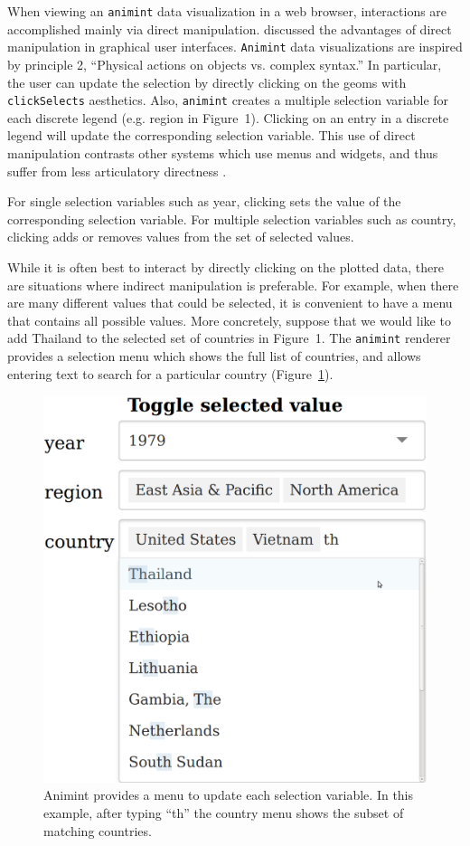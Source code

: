\documentclass[journal]{vgtc}\usepackage[]{graphicx}\usepackage[]{color}
\begin{document}
When viewing an \texttt{animint} data visualization in a web browser,
interactions are accomplished mainly via direct
manipulation. \citet{instrumental-interaction} discussed the
advantages of direct manipulation in graphical user
interfaces. \texttt{Animint} data visualizations are inspired by principle 2,
``Physical actions on objects vs. complex syntax.'' In particular, the
user can update the selection by directly clicking on the geoms with
\texttt{clickSelects} aesthetics. Also, \texttt{animint} creates a multiple
selection variable for each discrete legend (e.g. region in
Figure~1). Clicking on an entry in a discrete legend will update the
corresponding selection variable. This use of direct manipulation
contrasts other systems which use menus and widgets, and thus suffer
from less articulatory directness \citep{Hutchins:1985}.

For single selection variables such as year, clicking sets the value
of the corresponding selection variable. For multiple selection
variables such as country, clicking adds or removes values from the
set of selected values.

While it is often best to interact by directly clicking on the plotted
data, there are situations where indirect manipulation is
preferable. For example, when there are many different values that
could be selected, it is convenient to have a menu that contains all
possible values. More concretely, suppose that we would like to add
Thailand to the selected set of countries in Figure~1. The
\texttt{animint} renderer provides a selection menu which shows the
full list of countries, and allows entering text to search for a
particular country (Figure~\ref{fig:widgets}).


\begin{figure}[b!]
  \centering
  \includegraphics[width=0.5\columnwidth]{Screenshot-toggle-selected-value}
  \caption{Animint provides a menu to update each selection
    variable. In this example, after typing ``th'' the country menu
    shows the subset of matching countries.}
  \label{fig:widgets}
\end{figure}
\end{document}
